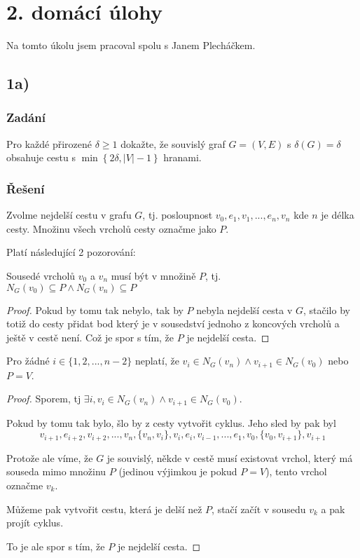 \documentclass[../main.tex]{subfiles}
\begin{document}
\section{2. domácí úlohy}

Na tomto úkolu jsem pracoval spolu s Janem Plecháčkem.

\subsection{1a)}
\subsubsection*{Zadání}
Pro každé přirozené $\delta\geq1$ dokažte, že souvislý graf
$G=(V,E)$ s $\delta(G) = \delta$ obsahuje cestu s $\min\left\{2\delta, |V| - 1\right\}$
hranami.

\subsubsection*{Řešení}

Zvolme nejdelší cestu v grafu $G$, tj. posloupnost $v_0, e_1, v_1, ..., e_n, v_n$
kde $n$ je délka cesty. Množinu všech vrcholů cesty označme jako $P$.

Platí následující 2 pozorování:

\begin{lemma*}
    Sousedé vrcholů $v_0$ a $v_n$ musí být v množině $P$, tj.\\ $N_G(v_0) \subseteq P \wedge N_G(v_n) \subseteq P$
\end{lemma*}

\begin{proof}
    Pokud by tomu tak nebylo, tak by $P$ nebyla nejdelší cesta v $G$, 
    stačilo by totiž do cesty přidat bod který je v sousedství jednoho z koncových vrcholů a ještě v cestě není.
    Což je spor s tím, že $P$ je nejdelší cesta.
\end{proof}


\begin{lemma*}
    Pro žádné $i\in\{  1,2,...,n-2 \}$ neplatí, že $v_i \in N_G(v_n) \wedge v_{i+1} \in N_G(v_0)$ nebo $P = V$.
\end{lemma*}
\begin{proof}
    Sporem, tj $\exists i, v_i \in N_G(v_n) \wedge v_{i+1} \in N_G(v_0)$.

    Pokud by tomu tak bylo, šlo by z cesty vytvořit cyklus. Jeho sled by pak byl  
    \begin{equation*}
        v_{i+1}, e_{i+2}, v_{i+2}, ..., v_n, \{v_n, v_i\}, v_i, e_i, v_{i-1}, ..., e_{1}, v_0, \{v_0, v_{i+1}\}, v_{i+1}
    \end{equation*}

    Protože ale víme, že $G$ je souvislý, někde v cestě musí existovat vrchol, 
    který má souseda mimo množinu $P$ (jedinou výjimkou je pokud $P = V$), tento vrchol označme $v_k$.
    
    Můžeme pak vytvořit cestu, která je delší než $P$, stačí začít v sousedu $v_k$ a pak projít cyklus.
    
    To je ale spor s tím, že $P$ je nejdelší cesta. 
\end{proof}
\end{document}
